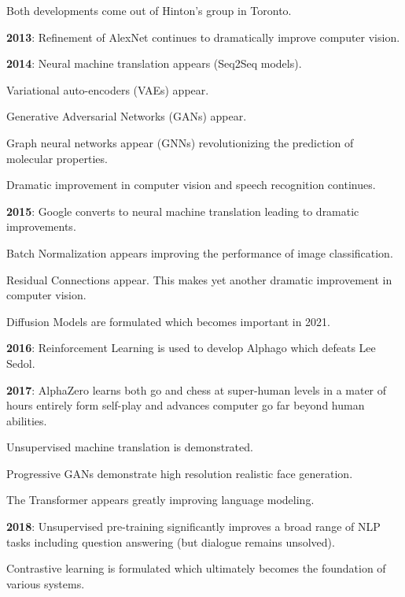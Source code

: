 {\vfill
Both developments come out of Hinton's group in Toronto.

\vfill
{\bf 2013}: Refinement of AlexNet continues to dramatically improve computer vision.


{\bf 2014}: Neural machine translation appears (Seq2Seq models).

\vfill
{\color{red} Variational auto-encoders} (VAEs) appear.

\vfill
{\color{red} Generative Adversarial Networks} (GANs) appear.

\vfill
{\color{red} Graph neural networks appear} (GNNs) revolutionizing the prediction of molecular properties.

\vfill
Dramatic improvement in computer vision and speech recognition continues.


{\bf 2015}: Google converts to neural machine translation leading to dramatic improvements.

\vfill
{\color{red} Batch Normalization} appears improving the performance of image classification.

\vfill
{{\color{red} Residual Connections} appear.  This makes yet another dramatic improvement in computer vision.

\vfill
{\color{red} Diffusion Models} are formulated which becomes important in 2021.

\vfill
{\bf 2016}: {\color{red} Reinforcement Learning} is used to develop Alphago which defeats Lee Sedol.


{\bf 2017}: AlphaZero learns both go and chess at super-human levels in a mater of hours entirely form self-play and advances computer go far beyond human abilities.

\vfill
Unsupervised machine translation is demonstrated.

\vfill
Progressive GANs demonstrate high resolution realistic face generation.

\vfill
The {\color{red} Transformer} appears greatly improving language modeling.


{\bf 2018}: {\color{red} Unsupervised pre-training} significantly improves a broad range of NLP tasks including question answering (but dialogue remains unsolved).

{\color{red} Contrastive learning} is formulated which ultimately becomes the foundation of various systems.

}}
